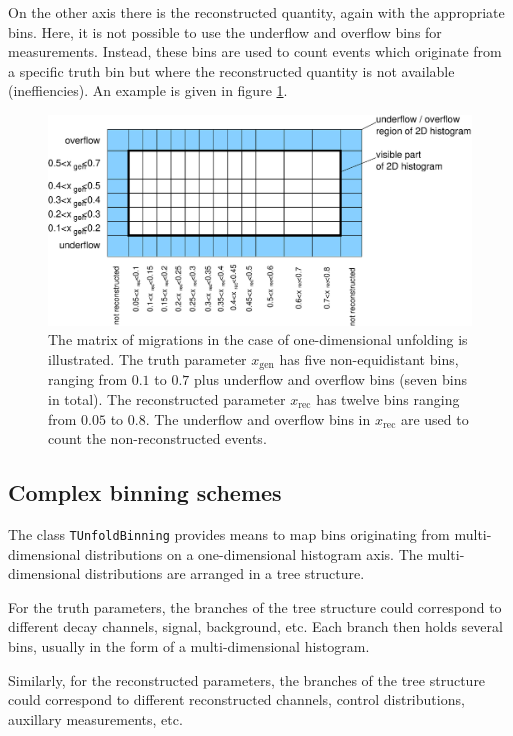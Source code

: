 \documentclass[12pt]{article}
\newlength{\figwidth}
\begin{document}
On the other axis there is the reconstructed quantity, again with the
appropriate bins. Here, it is not possible to use the underflow and overflow
bins for measurements. Instead, these bins are used to count events
which originate from a specific truth bin but where the reconstructed quantity
is not available (ineffiencies).
An example is given in figure \ref{fig:unfold1dim}.
\begin{figure}
\begin{center}
\includegraphics[width=0.7\figwidth]{fig/tunfold_manual_fig2.eps}
\end{center}
\caption{\label{fig:unfold1dim} The matrix of migrations in the case of
  one-dimensional unfolding 
  is illustrated. The truth parameter $x_{\text{gen}}$ has five
  non-equidistant bins, 
  ranging from $0.1$ to $0.7$ plus underflow and overflow bins (seven bins in
  total).
  The reconstructed parameter $x_{\text{rec}}$ has twelve
  bins ranging from $0.05$ to $0.8$. The underflow and overflow bins in
  $x_{\text{rec}}$ are used to count the non-reconstructed events.
}
\end{figure}

\subsection{Complex binning schemes}

The class {\tt TUnfoldBinning} provides means to map bins originating from 
multi-dimensional distributions on a one-dimensional histogram
axis. The multi-dimensional distributions are arranged in a
tree structure.

For the truth parameters, the branches of the tree structure could
correspond to different decay channels, signal, background,
etc. Each branch then holds several bins, usually in the form of
a multi-dimensional histogram.

Similarly, for the reconstructed parameters, the branches of the
tree structure could correspond to different reconstructed channels,
control distributions, auxillary measurements, etc.
\end{document}
